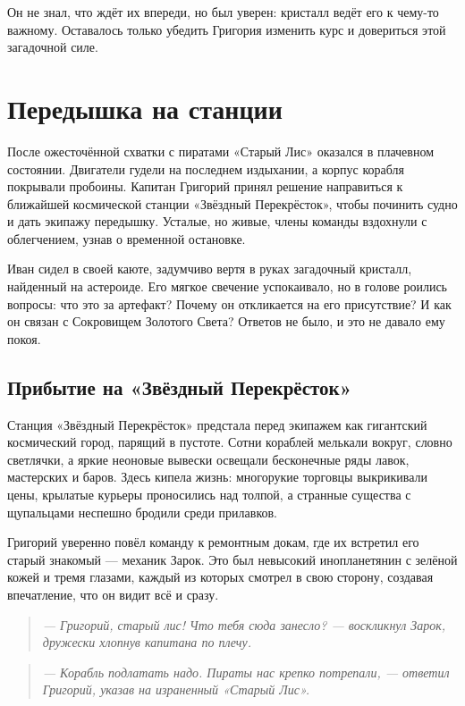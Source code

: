 \documentclass[12pt,a4paper]{book}
\newenvironment{dialogue}{\begin{quote}\itshape}{\end{quote}} %
\begin{document}
Он не знал, что ждёт их впереди, но был уверен: кристалл ведёт его к чему-то важному. Оставалось только убедить Григория изменить курс и довериться этой загадочной силе.

\chapter{Передышка на станции}

После ожесточённой схватки с пиратами «Старый Лис» оказался в плачевном состоянии. Двигатели гудели на последнем издыхании, а корпус корабля покрывали пробоины. Капитан Григорий принял решение направиться к ближайшей космической станции «Звёздный Перекрёсток», чтобы починить судно и дать экипажу передышку. Усталые, но живые, члены команды вздохнули с облегчением, узнав о временной остановке.

Иван сидел в своей каюте, задумчиво вертя в руках загадочный кристалл, найденный на астероиде. Его мягкое свечение успокаивало, но в голове роились вопросы: что это за артефакт? Почему он откликается на его присутствие? И как он связан с Сокровищем Золотого Света? Ответов не было, и это не давало ему покоя.

\section*{Прибытие на «Звёздный Перекрёсток»}

Станция «Звёздный Перекрёсток» предстала перед экипажем как гигантский космический город, парящий в пустоте. Сотни кораблей мелькали вокруг, словно светлячки, а яркие неоновые вывески освещали бесконечные ряды лавок, мастерских и баров. Здесь кипела жизнь: многорукие торговцы выкрикивали цены, крылатые курьеры проносились над толпой, а странные существа с щупальцами неспешно бродили среди прилавков.

Григорий уверенно повёл команду к ремонтным докам, где их встретил его старый знакомый --- механик Зарок. Это был невысокий инопланетянин с зелёной кожей и тремя глазами, каждый из которых смотрел в свою сторону, создавая впечатление, что он видит всё и сразу.

\begin{dialogue}
--- Григорий, старый лис! Что тебя сюда занесло? --- воскликнул Зарок, дружески хлопнув капитана по плечу.
\end{dialogue}

\begin{dialogue}
--- Корабль подлатать надо. Пираты нас крепко потрепали, --- ответил Григорий, указав на израненный «Старый Лис».
\end{dialogue}
\end{document}
